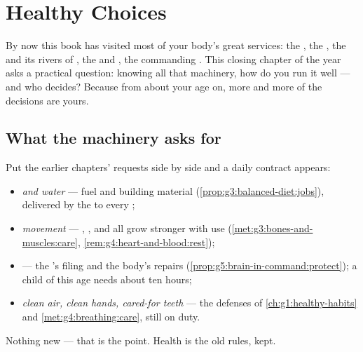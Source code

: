 \chapter{Healthy Choices}\label{ch:g5:healthy-choices}

By now this book has visited most of your body's great
services: the , the , the  and its
rivers of , the  and , the commanding .
This closing chapter of the year asks a practical question:
knowing all that machinery, how do you run it well --- and
who decides? Because from about your age on, more and more
of the decisions are yours.

\section{What the machinery asks for}

\begin{proposition}\label{prop:g5:healthy-choices:contract}
Put the earlier chapters' requests side by side and a daily
contract appears:
\begin{itemize}
  \item \emph{ and water} --- fuel and building
        material (\cref{prop:g3:balanced-diet:jobs}),
        delivered by the  to every ;
  \item \emph{movement} --- , ,  and 
        all grow stronger with use
        (\cref{met:g3:bones-and-muscles:care},
        \cref{rem:g4:heart-and-blood:rest});
  \item \emph{} --- the 's filing and the body's
        repairs (\cref{prop:g5:brain-in-command:protect}); a
        child of this age needs about ten hours;
  \item \emph{clean air, clean hands, cared-for teeth} ---
        the defenses of \cref{ch:g1:healthy-habits} and
        \cref{met:g4:breathing:care}, still on duty.
\end{itemize}
Nothing new --- that is the point. Health is the old rules,
kept.
\end{proposition}
\admitted


